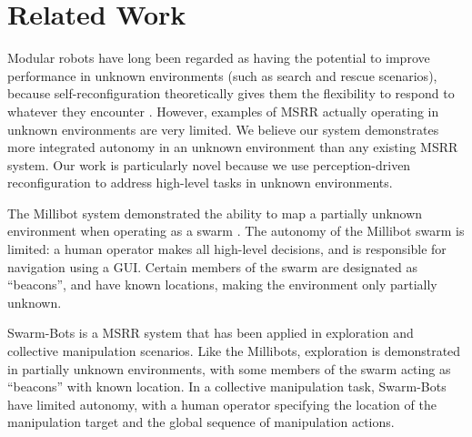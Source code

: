 \documentclass[conference]{IEEEtran}
\begin{document}

\section{Related Work}\label{sec:related-work}
%
%
Modular robots have long been regarded as having the potential to improve performance in unknown environments (such as search and rescue scenarios), because  self-reconfiguration theoretically gives them the flexibility to respond to whatever they encounter \cite{Yim2007a,yim2003modular}.  However, examples of MSRR actually operating in unknown environments are very limited. We believe our system demonstrates more integrated autonomy in an unknown environment than any existing MSRR system.  Our work is particularly novel because we use perception-driven reconfiguration to address high-level tasks in unknown environments.

The Millibot system demonstrated the ability to map a partially unknown environment when operating as a swarm \cite{Grabowski2000}. The autonomy of the Millibot swarm is limited: a human operator makes all high-level decisions, and is responsible for navigation using a GUI. Certain members of the swarm are designated as ``beacons'', and have known locations, making the environment only partially unknown.

Swarm-Bots is a MSRR system that has been applied in exploration \cite{Dorigo2005} and collective manipulation \cite{Mondada2005} scenarios.  Like the Millibots, exploration is demonstrated in partially unknown environments, with some members of the swarm acting as ``beacons'' with known location.  In a collective manipulation task, Swarm-Bots have limited autonomy, with a human operator specifying the location of the manipulation target and the global sequence of manipulation actions.
\end{document}
